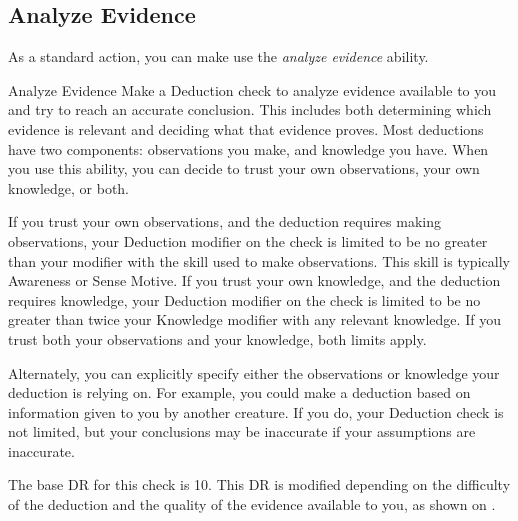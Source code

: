     \subsection{Analyze Evidence}
        As a standard action, you can make use the \textit{analyze evidence} ability.
        \begin{freeability}{Analyze Evidence}
            Make a Deduction check to analyze evidence available to you and try to reach an accurate conclusion.
            This includes both determining which evidence is relevant and deciding what that evidence proves.
            Most deductions have two components: observations you make, and knowledge you have.
            When you use this ability, you can decide to trust your own observations, your own knowledge, or both.

            If you trust your own observations, and the deduction requires making observations, your Deduction modifier on the check is limited to be no greater than your modifier with the skill used to make observations.
            This skill is typically Awareness or Sense Motive.
            If you trust your own knowledge, and the deduction requires knowledge, your Deduction modifier on the check is limited to be no greater than twice your Knowledge modifier with any relevant knowledge.
            If you trust both your observations and your knowledge, both limits apply.

            Alternately, you can explicitly specify either the observations or knowledge your deduction is relying on.
            For example, you could make a deduction based on information given to you by another creature.
            If you do, your Deduction check is not limited, but your conclusions may be inaccurate if your assumptions are inaccurate.

            The base DR for this check is 10.
            This DR is modified depending on the difficulty of the deduction and the quality of the evidence available to you, as shown on .
        \end{freeability}

